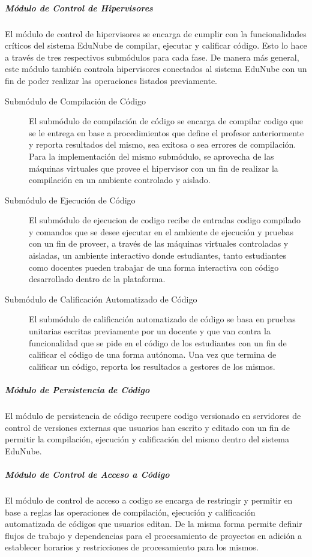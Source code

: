 \subparagraph{Módulo de Control de Hipervisores}
El módulo de control de hipervisores se encarga de cumplir con la funcionalidades críticos del sistema EduNube de compilar, ejecutar y calificar código. Esto lo hace a través de tres respectivos submódulos para cada fase. De manera más general, este módulo también controla hipervisores conectados al sistema EduNube con un fin de poder realizar las operaciones listados previamente.
\begin{description}
	\item[Submódulo de Compilación de Código]
	El submódulo de compilación de código se encarga de compilar codigo que se le entrega en base a procedimientos que define el profesor anteriormente y reporta resultados del mismo, sea exitosa o sea errores de compilación. Para la implementación del mismo submódulo, se aprovecha de las máquinas virtuales que provee el hipervisor con un fin de realizar la compilación en un ambiente controlado y aislado.
    \item[Submódulo de Ejecución de Código]
	El submódulo de ejecucion de codigo recibe de entradas codigo compilado y comandos que se desee ejecutar en el ambiente de ejecución y pruebas con un fin de proveer, a través de las máquinas virtuales controladas y aisladas, un ambiente interactivo donde estudiantes, tanto estudiantes como docentes pueden trabajar de una forma interactiva con código desarrollado dentro de la plataforma.
    \item[Submódulo de Calificación Automatizado de Código]
	El submódulo de calificación automatizado de código se basa en pruebas unitarias escritas previamente por un docente y que van contra la funcionalidad que se pide en el código de los estudiantes con un fin de calificar el código de una forma autónoma. Una vez que termina de calificar un código, reporta los resultados a gestores de los mismos.
\end{description}

\subparagraph{Módulo de Persistencia de Código}
El módulo de persistencia de código recupere codigo versionado en servidores de control de versiones externas que usuarios han escrito y editado con un fin de permitir la compilación, ejecución y calificación del mismo dentro del sistema EduNube.

\subparagraph{Módulo de Control de Acceso a Código}
El módulo de control de acceso a codigo se encarga de restringir y permitir en base a reglas las operaciones de compilación, ejecución y calificación automatizada de códigos que usuarios editan. De la misma forma permite definir flujos de trabajo y dependencias para el procesamiento de proyectos en adición a establecer horarios y restricciones de procesamiento para los mismos.

